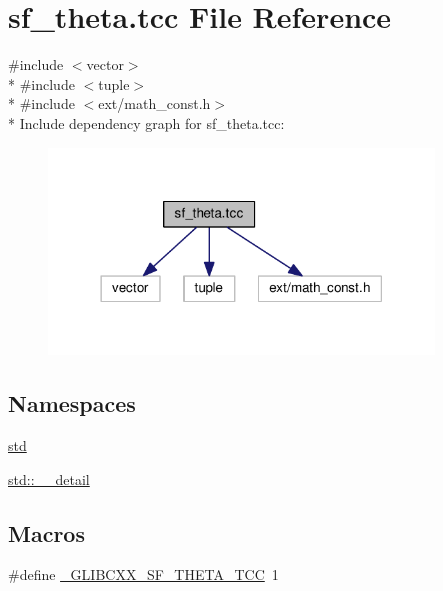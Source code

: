 \hypertarget{sf__theta_8tcc}{}\section{sf\+\_\+theta.\+tcc File Reference}
\label{sf__theta_8tcc}
{\ttfamily \#include $<$vector$>$}\\*
{\ttfamily \#include $<$tuple$>$}\\*
{\ttfamily \#include $<$ext/math\+\_\+const.\+h$>$}\\*
Include dependency graph for sf\+\_\+theta.\+tcc\+:\nopagebreak
\begin{figure}[H]
\begin{center}
\leavevmode
\includegraphics[width=290pt]{sf__theta_8tcc__incl}
\end{center}
\end{figure}
\subsection*{Namespaces}
\begin{DoxyCompactItemize}
\item 
 \hyperlink{namespacestd}{std}
\item 
 \hyperlink{namespacestd_1_1____detail}{std\+::\+\_\+\+\_\+detail}
\end{DoxyCompactItemize}
\subsection*{Macros}
\begin{DoxyCompactItemize}
\item 
\#define \hyperlink{sf__theta_8tcc_ac3032dc39d020bb26b2aad255473c5ab}{\+\_\+\+G\+L\+I\+B\+C\+X\+X\+\_\+\+S\+F\+\_\+\+T\+H\+E\+T\+A\+\_\+\+T\+C\+C}~1
\end{DoxyCompactItemize}
